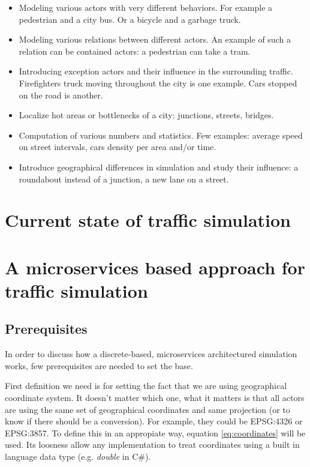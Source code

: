 \documentclass[a4paper,12pt,twoside]{book}
\begin{document}
\begin{itemize}
    \item Modeling various actors with very different behaviors. For example a pedestrian and a city bus. Or a bicycle and a garbage truck.
    \item Modeling various relations between different actors. An example of such a relation can be contained actors: a pedestrian can take a tram.
    \item Introducing exception actors and their influence in the surrounding traffic. Firefighters truck moving throughout the city is one example. Cars stopped on the road is another.
    \item Localize hot areas or bottlenecks of a city: junctions, streets, bridges.
    \item Computation of various numbers and statistics. Few examples: average speed on street intervals, cars density per area and/or time.
    \item Introduce geographical differences in simulation and study their influence: a roundabout instead of a junction, a new lane on a street.
\end{itemize}

\section{Current state of traffic simulation}

\section{A microservices based approach for traffic simulation}
\label{sec:microservicesbasedapproachtrafficsim}

\subsection{Prerequisites}
\label{subsec:prerequisites}
In order to discuss how a discrete-based, microservices architectured simulation works, few prerequisites are needed to set the base.

First definition we need is for setting the fact that we are using geographical coordinate system. It doesn't matter which one, what it matters is that all actors are using the same set of geographical coordinates and same projection (or to know if there should be a conversion). For example, they could be EPSG:4326 or EPSG:3857. To define this in an appropiate way, equation \ref{eq:coordinates} will be used. Its loosness allow any implementation to treat coordinates using a built in language data type (e.g. \textit{double} in C\#).
\end{document}
